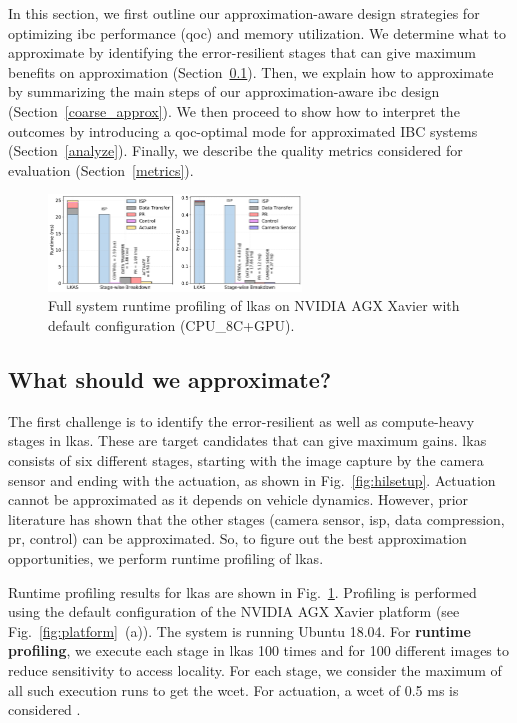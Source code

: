 In this section, we first outline our approximation-aware design strategies for optimizing \gls{ibc} performance (\gls{qoc}) and memory utilization. We determine what to approximate by identifying the error-resilient stages that can give maximum benefits on approximation (Section~\ref{profile}). Then, we explain how to approximate by summarizing the main steps of our approximation-aware \gls{ibc} design (Section~\ref{coarse_approx}). We then proceed to show how to interpret the outcomes by introducing a \gls{qoc}-optimal mode for approximated IBC systems (Section~\ref{analyze}). Finally, we describe the quality metrics considered for evaluation (Section~\ref{metrics}). 

\begin{figure}[thb]
	\centering
	\includegraphics[width= 0.6\textwidth]{figs/profiling_lkas_time.pdf}
	\captionsetup{width=0.8\textwidth}
	\caption{{Full system runtime profiling of \gls{lkas} on NVIDIA AGX Xavier with default configuration (CPU\_8C+GPU).}}
	\label{fig:profile_isp}
\end{figure}

\subsection{What should we approximate?}\label{profile}
The first challenge is to identify the error-resilient as well as compute-heavy stages in \gls{lkas}. These are target candidates that can give maximum gains. \Gls{lkas} consists of six different stages, starting with the image capture by the camera sensor and ending with the actuation, as shown in Fig.~\ref{fig:hilsetup}. Actuation cannot be approximated as it depends on vehicle dynamics. However, prior literature has shown that the other stages (camera sensor\cite{buckler}, \gls{isp}\cite{nn_invoke}, data compression\cite{araha}, \gls{pr}\cite{sde}, control\cite{araha2}) can be approximated. So, to figure out the best approximation opportunities, we perform runtime profiling of \gls{lkas}. 

\par Runtime profiling results for \gls{lkas} are shown in Fig.~\ref{fig:profile_isp}. Profiling is performed using the default configuration of the NVIDIA AGX Xavier platform (see Fig.~\ref{fig:platform}~(a)). The system is running Ubuntu 18.04. 
For \textbf{runtime profiling}, we execute each stage in \gls{lkas} 100 times and for 100 different images to reduce sensitivity to access locality. For each stage, we consider the maximum of all such execution runs to get the \gls{wcet}. For actuation, a \gls{wcet} of 0.5 ms is considered \cite{RandyFrank2016}. 

